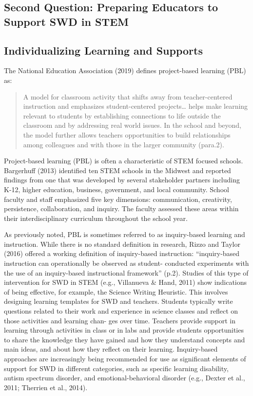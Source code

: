 \documentclass[11.5pt]{sig-alternate}
\begin{document}
\begin{large}
\subsection*{Second Question: Preparing Educators to Support SWD in STEM}

\subsection*{Individualizing Learning and Supports}
The National Education Association (2019) defines project-based learning (PBL) as:  
\begin{quotation}
\noindent
    A model for classroom activity that shifts away from teacher-centered instruction and emphasizes student-centered projects… helps make learning relevant to students by establishing connections to life outside the classroom and by addressing real world issues. In the school and beyond, the model further allows teachers opportunities to build relationships among colleagues and with those in the larger community (para.2).
\end{quotation}

Project-based learning (PBL) is often a characteristic of STEM focused schools. Bargerhuff (2013) identified ten STEM schools in the Midwest and reported findings from one that was developed by several stakeholder partners including K-12, higher education, business, government, and local community. School faculty and staff emphasized five key dimensions: communication, creativity, persistence, collaboration, and inquiry. The faculty assessed these areas within their interdisciplinary curriculum throughout the school year. 

As previously noted, PBL is sometimes referred to as inquiry-based learning and instruction. While there is no standard definition in research, Rizzo and Taylor (2016) offered a working definition of inquiry-based instruction: “inquiry-based instruction can operationally be observed as student- conducted experiments with the use of an inquiry-based instructional framework” (p.2). Studies of this type of intervention for SWD in STEM (e.g., Villanueva \& Hand, 2011) show indications of being effective, for example, the Science Writing Heuristic. This involves designing learning templates for SWD and teachers. Students typically write questions related to their work and experience in science classes and reflect on those activities and learning chan- ges over time. Teachers provide support in learning through activities in class or in labs and provide students opportunities to share the knowledge they have gained and how they understand concepts and main ideas, and about how they reflect on their learning. Inquiry-based approaches are increasingly being recommended for use as significant elements of support for SWD in different categories, such as specific learning disability, autism spectrum disorder, and emotional-behavioral disorder (e.g., Dexter et al., 2011; Therrien et al., 2014).


\end{large}
\end{document}
